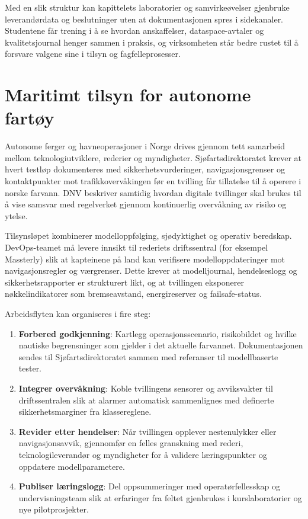 Med en slik struktur kan kapittelets laboratorier og samvirkeøvelser gjenbruke leverandørdata og beslutninger uten at dokumentasjonen spres i sidekanaler. Studentene får trening i å se hvordan anskaffelser, dataspace-avtaler og kvalitetsjournal henger sammen i praksis, og virksomheten står bedre rustet til å forsvare valgene sine i tilsyn og fagfelleprosesser.

\section{Maritimt tilsyn for autonome fartøy}
Autonome ferger og havneoperasjoner i Norge drives gjennom tett samarbeid mellom teknologiutviklere, rederier og myndigheter. Sjøfartsdirektoratet krever at hvert testløp dokumenteres med sikkerhetsvurderinger, navigasjonsgrenser og kontaktpunkter mot trafikkovervåkingen før en tvilling får tillatelse til å operere i norske farvann.\citep{sdir2023autonomefartoy} DNV beskriver samtidig hvordan digitale tvillinger skal brukes til å vise samsvar med regelverket gjennom kontinuerlig overvåkning av risiko og ytelse.\citep{dnv2024autonomous} 

Tilsynsløpet kombinerer modelloppfølging, sjødyktighet og operativ beredskap. DevOps-teamet må levere innsikt til rederiets driftssentral (for eksempel Massterly) slik at kapteinene på land kan verifisere modelloppdateringer mot navigasjonsregler og værgrenser.\citep{massterly2023operations} Dette krever at modelljournal, hendelseslogg og sikkerhetsrapporter er strukturert likt, og at tvillingen eksponerer nøkkelindikatorer som bremseavstand, energireserver og failsafe-status.

Arbeidsflyten kan organiseres i fire steg:
\begin{enumerate}
    \item \textbf{Forbered godkjenning}: Kartlegg operasjonsscenario, risikobildet og hvilke nautiske begrensninger som gjelder i det aktuelle farvannet. Dokumentasjonen sendes til Sjøfartsdirektoratet sammen med referanser til modellbaserte tester.
    \item \textbf{Integrer overvåkning}: Koble tvillingens sensorer og avviksvakter til driftssentralen slik at alarmer automatisk sammenlignes med definerte sikkerhetsmarginer fra klassereglene.
    \item \textbf{Revider etter hendelser}: Når tvillingen opplever nestenulykker eller navigasjonsavvik, gjennomfør en felles granskning med rederi, teknologileverandør og myndigheter for å validere læringspunkter og oppdatere modellparametere.
    \item \textbf{Publiser læringslogg}: Del oppsummeringer med operatørfellesskap og undervisningsteam slik at erfaringer fra feltet gjenbrukes i kurslaboratorier og nye pilotprosjekter.
\end{enumerate}

